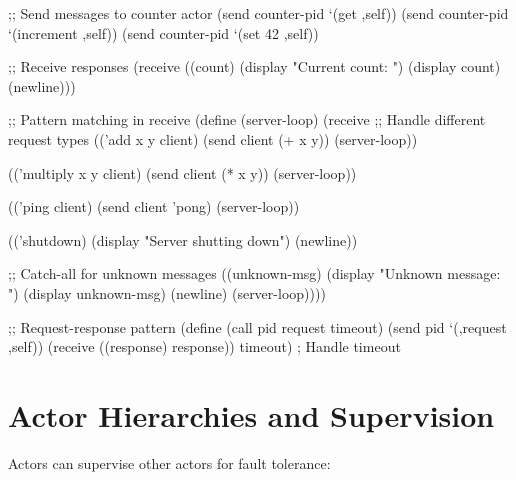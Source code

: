 \begin{example}
\begin{lambdustcode}
;; Send messages to counter actor
(send counter-pid `(get ,self))
(send counter-pid `(increment ,self))
(send counter-pid `(set 42 ,self))

;; Receive responses  
(receive
  ((count) (display "Current count: ") (display count) (newline)))

;; Pattern matching in receive
(define (server-loop)
  (receive
    ;; Handle different request types
    (('add x y client)
     (send client (+ x y))
     (server-loop))
    
    (('multiply x y client) 
     (send client (* x y))
     (server-loop))
    
    (('ping client)
     (send client 'pong)
     (server-loop))
    
    (('shutdown)
     (display "Server shutting down") (newline))
    
    ;; Catch-all for unknown messages
    ((unknown-msg)
     (display "Unknown message: ") (display unknown-msg) (newline)
     (server-loop))))

;; Request-response pattern
(define (call pid request timeout)
  (send pid `(,request ,self))
  (receive
    ((response) response))
  timeout)    ; Handle timeout
\end{lambdustcode}
\end{example}

\section{Actor Hierarchies and Supervision}
\label{sec:supervision}


Actors can supervise other actors for fault tolerance:

